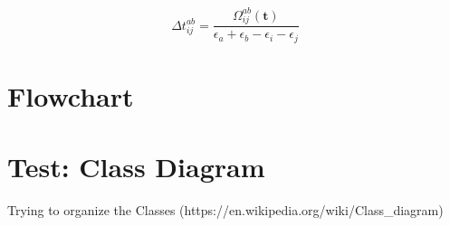\begin{equation}
  \Delta t_{ij}^{ab} = \frac{\Omega_{ij}^{ab}(\mathbf{t})}
  {\epsilon_a + \epsilon_b - \epsilon_i - \epsilon_j}
\end{equation}



\newpage
\section{Flowchart}
\label{sec:ccsd_flowchart}



\newpage
\section{Test: Class Diagram}
Trying to organize the Classes (https://en.wikipedia.org/wiki/Class\_diagram)



